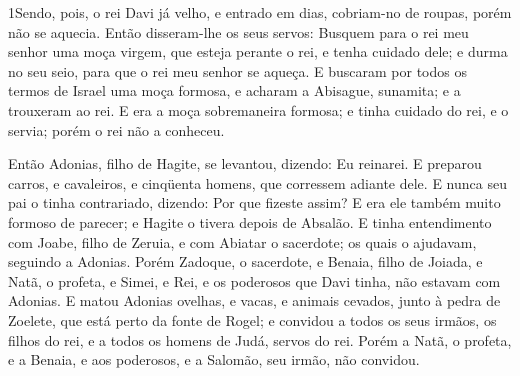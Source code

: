 
\lettrine{1} Sendo, pois, o rei Davi já velho, e entrado em
dias, cobriam-no de roupas, porém não se aquecia. Então
disseram-lhe os seus servos: Busquem para o rei meu senhor uma moça
virgem, que esteja perante o rei, e tenha cuidado dele; e durma no
seu seio, para que o rei meu senhor se aqueça. E buscaram por
todos os termos de Israel uma moça formosa, e acharam a Abisague,
sunamita; e a trouxeram ao rei. E era a moça sobremaneira
formosa; e tinha cuidado do rei, e o servia; porém o rei não a
conheceu.

Então Adonias, filho de Hagite, se levantou, dizendo: Eu reinarei.
E preparou carros, e cavaleiros, e cinqüenta homens, que corressem
adiante dele. E nunca seu pai o tinha contrariado, dizendo: Por
que fizeste assim? E era ele também muito formoso de parecer; e
Hagite o tivera depois de Absalão. E tinha entendimento com
Joabe, filho de Zeruia, e com Abiatar o sacerdote; os quais o
ajudavam, seguindo a Adonias. Porém Zadoque, o sacerdote, e
Benaia, filho de Joiada, e Natã, o profeta, e Simei, e Rei, e os
poderosos que Davi tinha, não estavam com Adonias. E matou
Adonias ovelhas, e vacas, e animais cevados, junto à pedra de
Zoelete, que está perto da fonte de Rogel; e convidou a todos os
seus irmãos, os filhos do rei, e a todos os homens de Judá, servos
do rei. Porém a Natã, o profeta, e a Benaia, e aos poderosos,
e a Salomão, seu irmão, não convidou.

